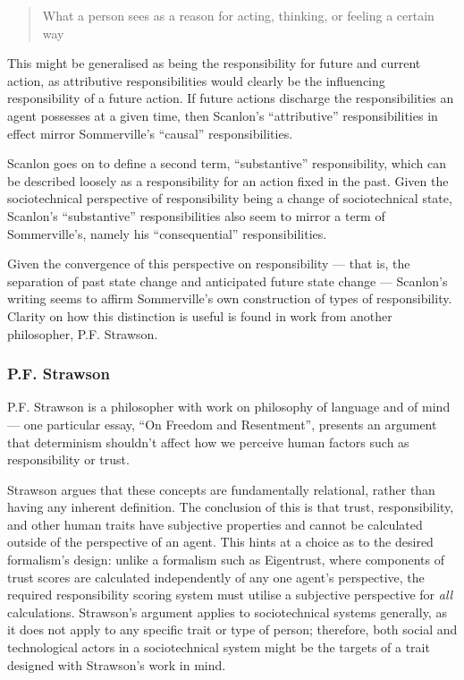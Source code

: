 \begin{quotation}
    What a person sees as a reason for acting, thinking, or feeling a certain way\cite{scanlon2006justice}
\end{quotation}

This might be generalised as being the responsibility for future and current action, as attributive responsibilities would clearly be the influencing responsibility of a future action. If future actions discharge the responsibilities an agent possesses at a given time, then Scanlon's ``attributive'' responsibilities in effect mirror Sommerville's ``causal'' responsibilities.\par

Scanlon goes on to define a second term, ``substantive'' responsibility, which can be described loosely as a responsibility for an action fixed in the past. Given the sociotechnical perspective of responsibility being a change of sociotechnical state, Scanlon's ``substantive'' responsibilities also seem to mirror a term of Sommerville's, namely his ``consequential'' responsibilities.\par

Given the convergence of this perspective on responsibility --- that is, the separation of past state change and anticipated future state change --- Scanlon's writing seems to affirm Sommerville's own construction of types of responsibility. Clarity on how this distinction is useful is found in work from another philosopher, P.F. Strawson.

\subsubsection{P.F. Strawson\cite{strawson}}  %
P.F. Strawson is a philosopher with work on philosophy of language and of mind --- one particular essay, ``On Freedom and Resentment''\cite{strawson}, presents an argument that determinism shouldn't affect how we perceive human factors such as responsibility or trust.\par

Strawson argues that these concepts are fundamentally relational, rather than having any inherent definition. The conclusion of this is that trust, responsibility, and other human traits have subjective properties and cannot be calculated outside of the perspective of an agent. This hints at a choice as to the desired formalism's design: unlike a formalism such as Eigentrust, where components of trust scores are calculated independently of any one agent's perspective, the required responsibility scoring system must utilise a subjective perspective for \emph{all} calculations. Strawson's argument applies to sociotechnical systems generally, as it does not apply to any specific trait or type of person; therefore, both social and technological actors in a sociotechnical system might be the targets of a trait designed with Strawson's work in mind.\par

